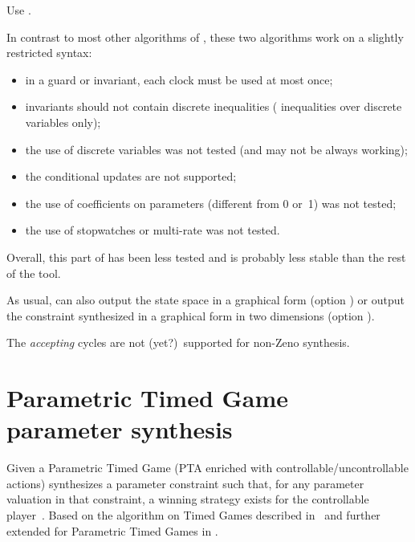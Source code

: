 	      Use .

\begin{becareful}[restrictions]
	In contrast to most other algorithms of \imitator{}, these two algorithms work on a slightly restricted syntax:
	\begin{itemize}
		\item in a guard or invariant, each clock must be used at most once;
		\item invariants should not contain discrete inequalities (\ie{} inequalities over discrete variables only);
		\item the use of discrete variables was not tested (and may not be always working);
		\item the conditional updates are not supported;
		\item the use of coefficients on parameters (different from 0 or~1) was not tested;
		\item the use of stopwatches or multi-rate was not tested.
	\end{itemize}
	Overall, this part of \imitator{} has been less tested and is probably less stable than the rest of the tool.
\end{becareful}

As usual, \imitator{} can also
output the state space in a graphical form (option )
or
output the constraint synthesized in a graphical form in two dimensions (option ).

\begin{remark}
	The \emph{accepting} cycles are not (yet?)\ supported for non-Zeno synthesis.
\end{remark}

\section{Parametric Timed Game parameter synthesis}\label{section:algorithm:ptg}
Given a Parametric Timed Game (PTA enriched with controllable/uncontrollable actions) synthesizes a parameter constraint such that, for any parameter valuation in that constraint, a winning strategy exists for the controllable player~\cite{DBLP:conf/tacas/DahlsenJensenFPP24}. Based on the algorithm on Timed Games described in~\cite{DBLP:conf/concur/CassezDFLL05} and further extended for Parametric Timed Games in \cite{DBLP:conf/wodes/JovanovicFLR12}.


